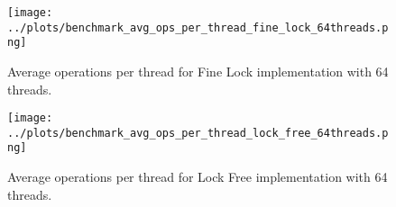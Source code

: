 \documentclass{article}
\begin{document}
\begin{figure}[ht!]
  \centering
  \texttt{[image: ../plots/benchmark\_avg\_ops\_per\_thread\_fine\_lock\_64threads.png]}
  \caption{Average operations per thread for Fine Lock implementation with 64 threads.}
  \label{fig:avg_ops_fine_lock}
\end{figure}

\begin{figure}[ht!]
  \centering
  \texttt{[image: ../plots/benchmark\_avg\_ops\_per\_thread\_lock\_free\_64threads.png]}
  \caption{Average operations per thread for Lock Free implementation with 64 threads.}
  \label{fig:avg_ops_lock_free}
\end{figure}
\end{document}
